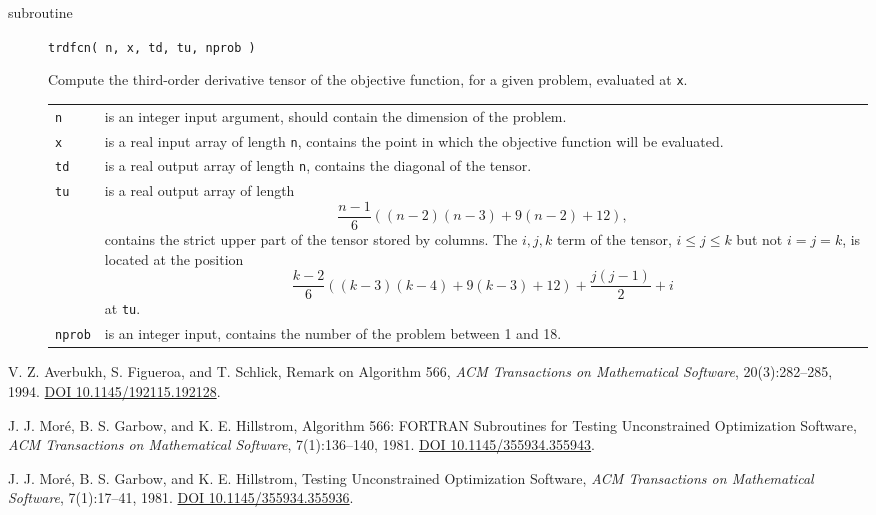 \documentclass[11pt]{article}
\begin{document}
\begin{description}
\item[subroutine] \verb|trdfcn( n, x, td, tu, nprob )|

  Compute the third-order derivative tensor of the objective function,
  for a given problem, evaluated at \verb|x|.

  \begin{longtable}{p{1cm} p{13.4cm}}
    \verb|n| & is an integer input argument, should contain the
    dimension of the problem. \\[1ex]

    \verb|x| & is a real input array of length \verb|n|, contains the
    point in which the objective function will be evaluated. \\[1ex]

    \verb|td| & is a real output array of length \verb|n|, contains
    the diagonal of the tensor. \\[1ex]

    \verb|tu| & is a real output array of length
    \[
    \displaystyle \frac{n-1}{6}( (n-2)(n-3) + 9(n-2) + 12 ),
    \]
    contains the strict upper part of the tensor stored by columns.
    The $i,j,k$ term of the tensor, $i \leq j \leq k$ but not $i=j=k$,
    is located at the position
    \[
    \displaystyle \frac{k-2}{6}( (k-3)(k-4) + 9(k-3) + 12 ) +
    \frac{j(j-1)}{2} + i
    \]
    at \verb|tu|. \\[1ex]

    \verb|nprob| & is an integer input, contains the number of the
    problem between 1 and 18.
  \end{longtable}
\end{description}

\begin{thebibliography}{9}

 V. Z. Averbukh, S. Figueroa, and T. Schlick, Remark
  on Algorithm 566, \textit{ACM Transactions on Mathematical
    Software}, 20(3):282--285,
  1994. \href{https://dx.doi.org/10.1145/192115.192128}{DOI
    10.1145/192115.192128}.

 J. J. Mor{\'e}, B. S. Garbow, and K. E. Hillstrom,
  Algorithm 566: FORTRAN Subroutines for Testing Unconstrained
  Optimization Software, \textit{ACM Transactions on Mathematical
    Software}, 7(1):136--140,
  1981. \href{https://dx.doi.org/10.1145/355934.355943}{DOI
    10.1145/355934.355943}.

 J. J. Mor{\'e}, B. S. Garbow, and K. E. Hillstrom,
  Testing Unconstrained Optimization Software, \textit{ACM
    Transactions on Mathematical Software}, 7(1):17--41,
  1981. \href{https://dx.doi.org/10.1145/355934.355936}{DOI
    10.1145/355934.355936}.

\end{thebibliography}
\end{document}
